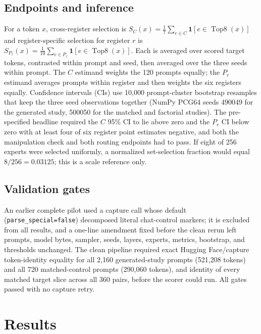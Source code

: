 \documentclass[10pt,a4paper,twocolumn]{article}
\newcommand{\Top}{\operatorname{Top8}}
\begin{document}
\subsection{Endpoints and inference}

For a token \(x\), cross-register selection is
\(S_C(x)=\frac{1}{7}\sum_{e\in C}\mathbf{1}[e\in\Top(x)]\) and
register-specific selection for register \(r\) is
\(S_{P_r}(x)=\frac{1}{10}\sum_{e\in P_r}\mathbf{1}[e\in\Top(x)]\). Each is
averaged over scored target tokens, contrasted within prompt and seed, then
averaged over the three seeds within prompt. The \(C\) estimand weights the 120
prompts equally; the \(P_r\) estimand averages prompts within register and then
weights the six registers equally. Confidence intervals (CIs) use 10,000
prompt-cluster bootstrap resamples that keep the three seed observations
together (NumPy PCG64 seeds 490049 for the generated study, 500050 for the
matched and factorial studies). The pre-specified headline required the \(C\)
95\% CI to lie above zero and the \(P_r\) CI below zero with at least four of
six register point estimates negative, and both the manipulation check and both
routing endpoints had to pass. If eight of 256 experts were selected uniformly,
a normalized set-selection fraction would equal \(8/256=0.03125\); this is a
scale reference only.

\subsection{Validation gates}\label{sec:audit}

An earlier complete pilot used a capture call whose default
(\texttt{parse\_special=false}) decomposed literal chat-control markers; it is
excluded from all results, and a one-line amendment fixed before the clean
rerun left prompts, model bytes, sampler, seeds, layers, experts, metrics,
bootstrap, and thresholds unchanged. The clean pipeline required exact Hugging
Face/capture token-identity equality for all 2,160 generated-study prompts
(521,208 tokens) and all 720 matched-control prompts (290,060 tokens), and
identity of every matched target slice across all 360 pairs, before the
scorer could run. All gates passed with no capture retry.

\section{Results}\label{sec:results}
\end{document}
